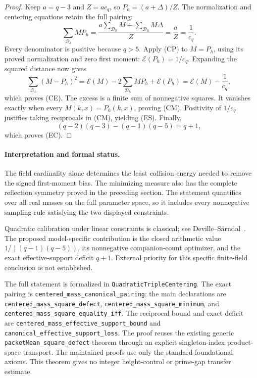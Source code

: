 \documentclass[11pt]{article}
\begin{document}
\begin{proof}
Keep \(a=q-3\) and \(Z=a c_q\), so \(P_h=(a+\Delta)/Z\).
The normalization and centering equations retain the full pairing:
\[
 \sum_{\mathcal D_h}MP_h
 =\frac{a\sum_{\mathcal D_h}M+\sum_{\mathcal D_h}M\Delta}{Z}
 =\frac aZ=\frac1{c_q}. \tag{CP}
\]
Every denominator is positive because \(q>5\). Apply (CP) to
\(M=P_h\), using its proved normalization and zero first moment:
\(\mathcal E(P_h)=1/c_q\).
Expanding the squared distance now gives
\[
 \sum_{\mathcal D_h}(M-P_h)^2
 =\mathcal E(M)-2\sum_{\mathcal D_h}MP_h+\mathcal E(P_h)
 =\mathcal E(M)-\frac1{c_q},
\]
which proves (CE). The excess is a finite sum of nonnegative squares.
It vanishes exactly when every \(M(k,x)=P_h(k,x)\), proving (CM).
Positivity of \(1/c_q\) justifies taking reciprocals in (CM), yielding
(ES). Finally,
\[
 (q-2)(q-3)-(q-1)(q-5)=q+1,
\]
which proves (EC).
\end{proof}

\paragraph{Interpretation and formal status.}
The field cardinality alone determines the least collision energy
needed to remove the signed first-moment bias. The minimizing measure
also has the complete reflection symmetry proved in the preceding
section. The statement quantifies over all real masses on the full
parameter space, so it includes every nonnegative sampling rule
satisfying the two displayed constraints.

Quadratic calibration under linear constraints is classical;
see Deville--S\"arndal~\cite{DevilleSarndalCalibration}. The proposed
model-specific contribution is the closed arithmetic value
\(1/((q-1)(q-5))\), its nonnegative companion-count optimizer, and the
exact effective-support deficit \(q+1\). External priority for this
specific finite-field conclusion is not established.

The full statement is formalized in \texttt{QuadraticTripleCentering}.
The exact pairing is
\texttt{centered\_mass\_canonical\_pairing}; the main declarations are
\texttt{centered\_mass\_square\_defect},
\texttt{centered\_mass\_square\_minimum}, and
\texttt{centered\_mass\_square\_equality\_iff}.
The reciprocal bound and exact deficit are
\texttt{centered\_mass\_effective\_support\_bound} and
\texttt{canonical\_effective\_support\_loss}.
The proof reuses the existing generic
\texttt{packetMean\_square\_defect} theorem through an explicit
singleton-index product-space transport. The maintained proofs use
only the standard foundational axioms. This theorem gives no
integer height-control or prime-gap transfer estimate.
\end{document}
